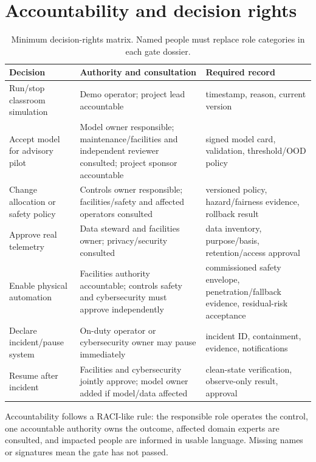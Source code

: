 \section{Accountability and decision rights}
\begin{table}[H]
\centering
\caption{Minimum decision-rights matrix. Named people must replace role categories in each gate dossier.}
\label{tab:decision-rights}
\begin{tabularx}{\textwidth}{L{0.25\textwidth}Y L{0.25\textwidth}}
\toprule
Decision & Authority and consultation & Required record\\
\midrule
Run/stop classroom simulation & Demo operator; project lead accountable & timestamp, reason, current version\\
Accept model for advisory pilot & Model owner responsible; maintenance/facilities and independent reviewer consulted; project sponsor accountable & signed model card, validation, threshold/OOD policy\\
Change allocation or safety policy & Controls owner responsible; facilities/safety and affected operators consulted & versioned policy, hazard/fairness evidence, rollback result\\
Approve real telemetry & Data steward and facilities owner; privacy/security consulted & data inventory, purpose/basis, retention/access approval\\
Enable physical automation & Facilities authority accountable; controls safety and cybersecurity must approve independently & commissioned safety envelope, penetration/fallback evidence, residual-risk acceptance\\
Declare incident/pause system & On-duty operator or cybersecurity owner may pause immediately & incident ID, containment, evidence, notifications\\
Resume after incident & Facilities and cybersecurity jointly approve; model owner added if model/data affected & clean-state verification, observe-only result, approval\\
\bottomrule
\end{tabularx}
\end{table}
Accountability follows a RACI-like rule: the responsible role operates the control, one accountable authority owns the outcome, affected domain experts are consulted, and impacted people are informed in usable language. Missing names or signatures mean the gate has not passed.

